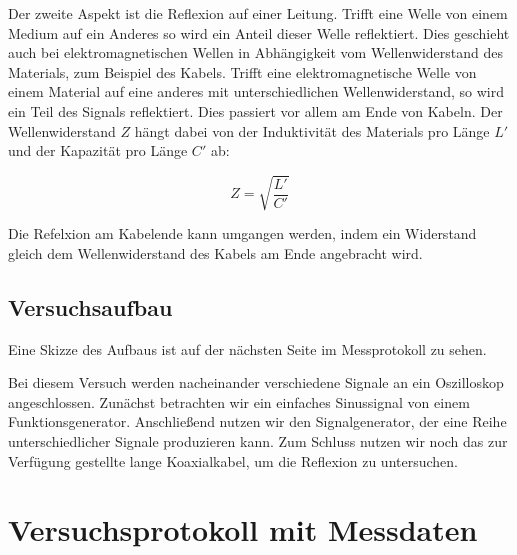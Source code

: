 \documentclass{article}
\begin{document}
Der zweite Aspekt ist die Reflexion auf einer Leitung. Trifft eine Welle von einem Medium auf ein Anderes so wird ein Anteil dieser Welle reflektiert. Dies geschieht auch bei elektromagnetischen Wellen in Abhängigkeit vom Wellenwiderstand des Materials, zum Beispiel des Kabels. Trifft eine elektromagnetische Welle von einem Material auf eine anderes mit unterschiedlichen Wellenwiderstand, so wird ein Teil des Signals reflektiert. Dies passiert vor allem am Ende von Kabeln. Der Wellenwiderstand $Z$ hängt dabei von der Induktivität des Materials pro Länge $L'$ und der Kapazität pro Länge $C'$ ab:

\begin{equation}
    Z = \sqrt{\frac{L'}{C'}}
\end{equation}

Die Refelxion am Kabelende kann umgangen werden, indem ein Widerstand gleich dem Wellenwiderstand des Kabels am Ende angebracht wird.

\subsection{Versuchsaufbau}

Eine Skizze des Aufbaus ist auf der nächsten Seite im Messprotokoll zu sehen. 

Bei diesem Versuch werden nacheinander verschiedene Signale an ein Oszilloskop angeschlossen. Zunächst betrachten wir ein einfaches Sinussignal von einem Funktionsgenerator. Anschließend nutzen wir den Signalgenerator, der eine Reihe unterschiedlicher Signale produzieren kann. Zum Schluss nutzen wir noch das zur Verfügung gestellte lange Koaxialkabel, um die Reflexion zu untersuchen.

\newpage

\section{Versuchsprotokoll mit Messdaten}
\end{document}
